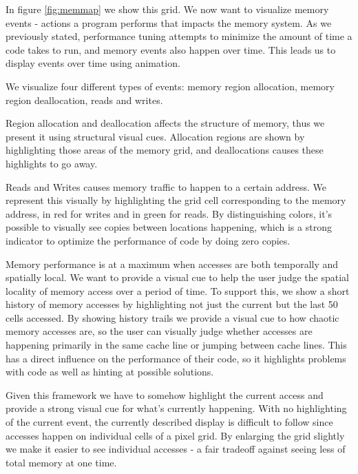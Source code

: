 \documentclass[annual]{acmsiggraph}
\begin{document}
  In figure \ref{fig:memmap} we show this grid. We now want to visualize memory events - actions a program performs that impacts the memory system. As we previously stated, performance tuning attempts to minimize the amount of time a code takes to run, and memory events also happen over time. This leads us to display events over time using animation. 
  
  We visualize four different types of events: memory region allocation, memory region deallocation, reads and writes.
  
  Region allocation and deallocation affects the structure of memory, thus we present it using structural visual cues. Allocation regions are shown by highlighting those areas of the memory grid, and deallocations causes these highlights to go away.
  
  Reads and Writes causes memory traffic to happen to a certain address. We represent this visually by highlighting the grid cell corresponding to the memory address, in red for writes and in green for reads. By distinguishing colors, it's possible to visually see copies between locations happening, which is a strong indicator to optimize the performance of code by doing zero copies.
    
  Memory performance is at a maximum when accesses are both temporally and spatially local. We want to provide a visual cue to help the user judge the spatial locality of memory access over a period of time. To support this, we show a short history of memory accesses by highlighting not just the current but the last 50 cells accessed. By showing history trails we provide a visual cue to how chaotic memory accesses are, so the user can visually judge whether accesses are happening primarily in the same cache line or jumping between cache lines. This has a direct influence on the performance of their code, so it highlights problems with code as well as hinting at possible solutions.
  
  Given this framework we have to somehow highlight the current access and provide a strong visual cue for what's currently happening. With no highlighting of the current event, the currently described display is difficult to follow since accesses happen on individual cells of a pixel grid. By enlarging the grid slightly we make it easier to see individual accesses - a fair tradeoff against seeing less of total memory at one time.
  
\end{document}
